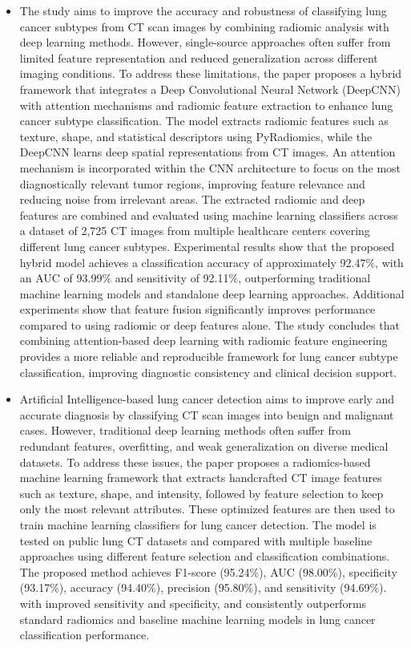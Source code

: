 \begin{itemize}
	\item The study aims to improve the accuracy and robustness of classifying lung cancer subtypes from CT scan images by combining radiomic analysis with deep learning methods. However, single-source approaches often suffer from limited feature representation and reduced generalization across different imaging conditions. To address these limitations, the paper proposes a hybrid framework that integrates a Deep Convolutional Neural Network (DeepCNN) with attention mechanisms and radiomic feature extraction to enhance lung cancer subtype classification. The model extracts radiomic features such as texture, shape, and statistical descriptors using PyRadiomics, while the DeepCNN learns deep spatial representations from CT images. An attention mechanism is incorporated within the CNN architecture to focus on the most diagnostically relevant tumor regions, improving feature relevance and reducing noise from irrelevant areas. The extracted radiomic and deep features are combined and evaluated using machine learning classifiers across a dataset of 2,725 CT images from multiple healthcare centers covering different lung cancer subtypes. Experimental results show that the proposed hybrid model achieves a classification accuracy of approximately 92.47\%, with an AUC of 93.99\% and sensitivity of 92.11\%, outperforming traditional machine learning models and standalone deep learning approaches. Additional experiments show that feature fusion significantly improves performance compared to using radiomic or deep features alone. The study concludes that combining attention-based deep learning with radiomic feature engineering provides a more reliable and reproducible framework for lung cancer subtype classification, improving diagnostic consistency and clinical decision support. \cite{muna2025}
	\item Artificial Intelligence-based lung cancer detection aims to improve early and accurate diagnosis by classifying CT scan images into benign and malignant cases. However, traditional deep learning methods often suffer from redundant features, overfitting, and weak generalization on diverse medical datasets. To address these issues, the paper proposes a radiomics-based machine learning framework that extracts handcrafted CT image features such as texture, shape, and intensity, followed by feature selection to keep only the most relevant attributes. These optimized features are then used to train machine learning classifiers for lung cancer detection. The model is tested on public lung CT datasets and compared with multiple baseline approaches using different feature selection and classification combinations. The proposed method achieves F1-score (95.24\%), AUC (98.00\%), specificity (93.17\%), accuracy (94.40\%), precision (95.80\%), and sensitivity (94.69\%). with improved sensitivity and specificity, and consistently outperforms standard radiomics and baseline machine learning models in lung cancer classification performance. \cite{zia2024}
\end{itemize}

